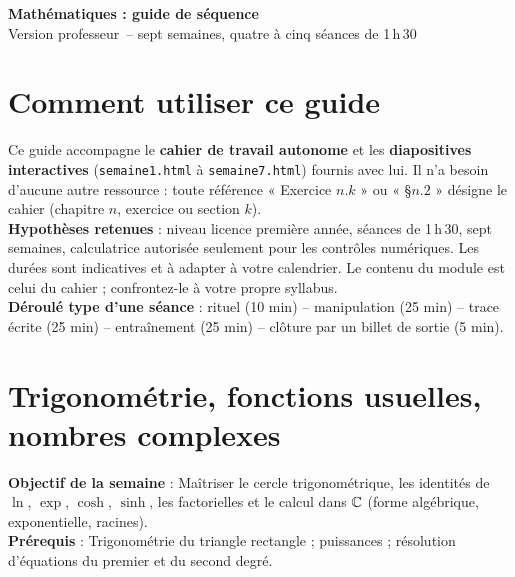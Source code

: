 \documentclass[10.5pt,a4paper]{article}
\newcommand{\titrecourant}{Guide de séquence}
\begin{document}
\begin{center}{\LARGE\bfseries\textcolor{marine}{Mathématiques : guide de séquence}}\\[3pt]
{\large\textcolor{ardoise}{Version professeur\ -- sept semaines, quatre à cinq séances de 1\,h\,30}}\end{center}
\section*{Comment utiliser ce guide}
\begin{objectif}
Ce guide accompagne le \textbf{cahier de travail autonome} et les \textbf{diapositives interactives} (\texttt{semaine1.html} à \texttt{semaine7.html}) fournis avec lui. Il n'a besoin d'aucune autre ressource : toute référence « Exercice $n.k$ » ou « \S$n.2$ » désigne le cahier (chapitre $n$, exercice ou section $k$).\\
\textbf{Hypothèses retenues} : niveau licence première année, séances de 1\,h\,30, sept semaines, calculatrice autorisée seulement pour les contrôles numériques. Les durées sont indicatives et à adapter à votre calendrier. Le contenu du module est celui du cahier ; confrontez-le à votre propre syllabus.\\
\textbf{Déroulé type d'une séance} : rituel (10 min) -- manipulation (25 min) -- trace écrite (25 min) -- entraînement (25 min) -- clôture par un billet de sortie (5 min).
\end{objectif}
\clearpage
\section{Trigonométrie, fonctions usuelles, nombres complexes}
\renewcommand{\titrecourant}{Semaine 1}
\begin{objectif}\textbf{Objectif de la semaine} : Maîtriser le cercle trigonométrique, les identités de $\ln$, $\exp$, $\cosh$, $\sinh$, les factorielles et le calcul dans $\mathbb{C}$ (forme algébrique, exponentielle, racines).\\\textbf{Prérequis} : Trigonométrie du triangle rectangle ; puissances ; résolution d'équations du premier et du second degré.\end{objectif}
\end{document}
